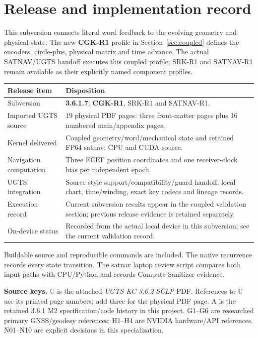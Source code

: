 \documentclass[11pt,a4paper]{article}
\begin{document}
\section*{Release and implementation record}
This subversion connects literal word feedback to the evolving geometry and
physical state. The new \textbf{CGK-R1} profile in Section~\ref{sec:coupled}
defines the encoders, circle-plus, physical matrix and time advance. The actual
SATNAV/UGTS handoff executes this coupled profile; SRK-R1 and SATNAV-R1 remain
available as their explicitly named component profiles.

\begin{center}
\begin{tabularx}{\textwidth}{@{}P{.30\textwidth}Y@{}}\toprule
\textbf{Release item} & \textbf{Disposition}\\\midrule
Subversion & \textbf{3.6.1.7}; \textbf{CGK-R1}, SRK-R1 and SATNAV-R1.\\
Imported UGTS source & 19 physical PDF pages: three front-matter pages plus 16 numbered main/appendix pages.\\
Kernel delivered & Coupled geometry/word/mechanical state and retained FP64 satnav; CPU and CUDA source.\\
Navigation computation & Three ECEF position coordinates and one receiver-clock bias per independent epoch.\\
UGTS integration & Source-style support/compatibility/guard handoff, local chart, time/winding, exact key codecs and lineage records.\\
Execution record & Current subversion results appear in the coupled validation section; previous release evidence is retained separately.\\
On-device status & Recorded from the actual local device in this subversion; see the current validation record.\\\bottomrule
\end{tabularx}
\end{center}

Buildable source and reproducible commands are included. The native recurrence
records every state transition. The satnav laptop review script compares both
input paths with CPU/Python and records Compute Sanitizer evidence.

\textbf{Source keys.} U is the attached \emph{UGTS-KC 3.6.2 SCLP} PDF. References to U
use its printed page numbers; add three for the physical PDF page. A is the retained
3.6.1 M2 specification/code history in this project. G1--G6 are researched primary
GNSS/geodesy references; H1--H4 are NVIDIA hardware/API references. N01--N10 are
explicit decisions in this specialization.
\end{document}

